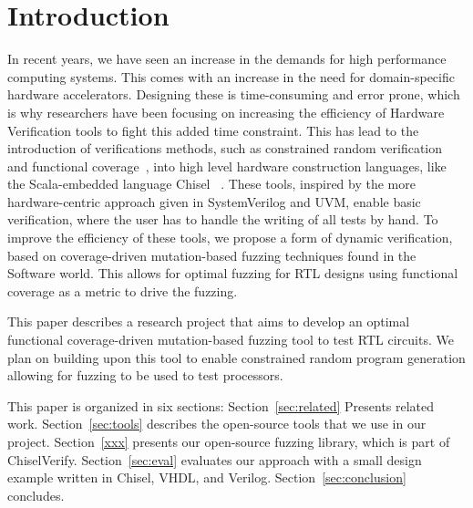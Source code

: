 \documentclass[conference]{IEEEtran}
\begin{document}
\section{Introduction}
\label{sec:intro}

In recent years, we have seen an increase in the demands for high performance computing systems.  
This comes with an increase in the need for domain-specific hardware accelerators.  
Designing these is time-consuming and error prone, which is why researchers have been focusing on increasing the efficiency of Hardware Verification tools to fight this added time constraint.
This has lead to the introduction of verifications methods, such as constrained random verification and functional coverage~\cite{verify:chisel:2020, dobis2021opensource}, into high level hardware construction languages, like the Scala-embedded language Chisel~\cite{chisel:dac2012, chisel:book} .
These tools, inspired by the more hardware-centric approach given in SystemVerilog and UVM, enable basic verification, where the user has to handle the writing of all tests by hand.
To improve the efficiency of these tools, we propose a form of dynamic verification, based on coverage-driven mutation-based fuzzing techniques found in the Software world.
This allows for optimal fuzzing for RTL designs using functional coverage as a metric to drive the fuzzing.

This paper describes a research project that aims to develop an optimal functional coverage-driven mutation-based fuzzing tool to test RTL circuits.
We plan on building upon this tool to enable constrained random program generation allowing for fuzzing to be used to test processors.

This paper is organized in six sections: %
Section~\ref{sec:related}  Presents related work.
Section~\ref{sec:tools} describes the open-source tools that we use in our project.
Section~\ref{xxx} presents our open-source fuzzing library, which is part of ChiselVerify.
Section~\ref{sec:eval} evaluates our approach with a small design example written in Chisel, VHDL,
and Verilog.
Section~\ref{sec:conclusion} concludes.
\end{document}
